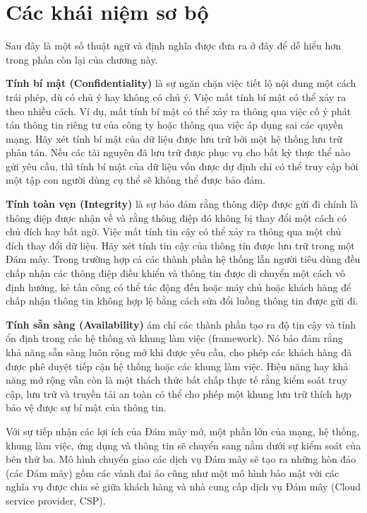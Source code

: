 \section*{Các khái niệm sơ bộ}

Sau đây là một số thuật ngữ và định nghĩa được đưa ra ở đây để dễ hiểu hơn trong phần còn lại của chương này.

\textbf{Tính bí mật (Confidentiality)} là sự ngăn chặn việc tiết lộ nội dung một cách trái phép, dù có chủ ý hay không có chủ ý. Việc mất tính bí mật có thể xảy ra theo nhiều cách. Ví dụ, mất tính bí mật có thể xảy ra thông qua việc cố ý phát tán thông tin riêng tư của công ty hoặc thông qua việc áp dụng sai các quyền mạng. Hãy xét tính bí mật của dữ liệu được lưu trữ bởi một hệ thống lưu trữ phân tán. Nếu các tài nguyên đã lưu trữ được phục vụ cho bất kỳ thực thể nào gửi yêu cầu, thì tính bí mật của dữ liệu vốn được dự định chỉ có thể truy cập bởi một tập con người dùng cụ thể sẽ không thể được bảo đảm.

\textbf{Tính toàn vẹn (Integrity)} là sự bảo đảm rằng thông điệp được gửi đi chính là thông điệp được nhận về và rằng thông điệp đó không bị thay đổi một cách có chủ đích hay bất ngờ. Việc mất tính tin cậy có thể xảy ra thông qua một chủ đích thay đổi dữ liệu. Hãy xét tính tin cậy của thông tin được lưu trữ trong một Đám mây. Trong trường hợp cả các thành phần hệ thống lẫn người tiêu dùng đều chấp nhận các thông điệp điều khiển và thông tin được di chuyển một cách vô định hướng, kẻ tấn công có thể tác động đến hoặc máy chủ hoặc khách hàng để chấp nhận thông tin không hợp lệ bằng cách sửa đổi luồng thông tin được gửi đi.

\textbf{Tính sẵn sàng (Availability)} ám chỉ các thành phần tạo ra độ tin cậy và tính ổn định trong các hệ thống và khung làm việc (framework). Nó bảo đảm rằng khả năng sẵn sàng luôn rộng mở khi được yêu cầu, cho phép các khách hàng đã được phê duyệt tiếp cận hệ thống hoặc các khung làm việc. Hiệu năng hay khả năng mở rộng vẫn còn là một thách thức bất chấp thực tế rằng kiểm soát truy cập, lưu trữ và truyền tải an toàn có thể cho phép một khung lưu trữ thích hợp bảo vệ được sự bí mật của thông tin.

Với sự tiếp nhận các lợi ích của Đám mây mở, một phần lớn của mạng, hệ thống, khung làm việc, ứng dụng và thông tin sẽ chuyển sang nằm dưới sự kiểm soát của bên thứ ba. Mô hình chuyển giao các dịch vụ Đám mây sẽ tạo ra những hòn đảo (các Đám mây) gồm các vành đai ảo cũng như một mô hình bảo mật với các nghĩa vụ được chia sẻ giữa khách hàng và nhà cung cấp dịch vụ Đám mây (Cloud service provider, CSP).

